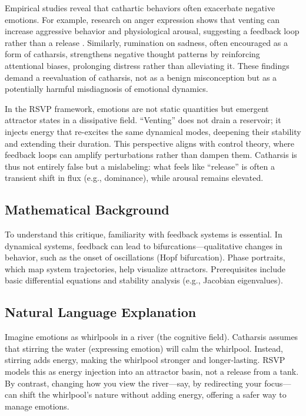 \documentclass[11pt]{article}
\theoremstyle{plain}
\begin{document}
Empirical studies reveal that cathartic behaviors often exacerbate negative emotions. For example, research on anger expression shows that venting can increase aggressive behavior and physiological arousal, suggesting a feedback loop rather than a release \citep{Brown1988}. Similarly, rumination on sadness, often encouraged as a form of catharsis, strengthens negative thought patterns by reinforcing attentional biases, prolonging distress rather than alleviating it. These findings demand a reevaluation of catharsis, not as a benign misconception but as a potentially harmful misdiagnosis of emotional dynamics.

In the RSVP framework, emotions are not static quantities but emergent attractor states in a dissipative field. “Venting” does not drain a reservoir; it injects energy that re-excites the same dynamical modes, deepening their stability and extending their duration. This perspective aligns with control theory, where feedback loops can amplify perturbations rather than dampen them. Catharsis is thus not entirely false but a mislabeling: what feels like “release” is often a transient shift in flux (e.g., dominance), while arousal remains elevated.

\subsection{Mathematical Background}
To understand this critique, familiarity with feedback systems is essential. In dynamical systems, feedback can lead to bifurcations—qualitative changes in behavior, such as the onset of oscillations (Hopf bifurcation). Phase portraits, which map system trajectories, help visualize attractors. Prerequisites include basic differential equations and stability analysis (e.g., Jacobian eigenvalues).

\subsection{Natural Language Explanation}
Imagine emotions as whirlpools in a river (the cognitive field). Catharsis assumes that stirring the water (expressing emotion) will calm the whirlpool. Instead, stirring adds energy, making the whirlpool stronger and longer-lasting. RSVP models this as energy injection into an attractor basin, not a release from a tank. By contrast, changing how you view the river—say, by redirecting your focus—can shift the whirlpool’s nature without adding energy, offering a safer way to manage emotions.
\end{document}
